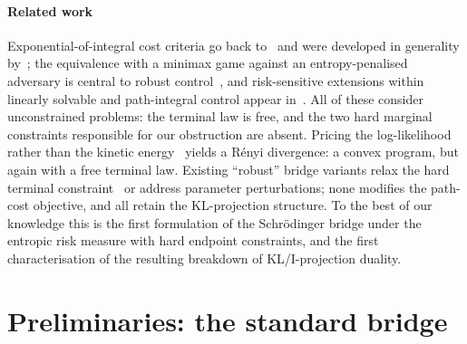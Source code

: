 \documentclass[letterpaper,10pt,conference]{IEEEtran}
\begin{document}
	\paragraph*{Related work}
	Exponential-of-integral cost criteria go back to~\cite{jacobson1973} and were
	developed in generality by~\cite{whittle1990,flemingmceneaney1995};
	the equivalence with a minimax game against an entropy-penalised adversary is
	central to robust control~\cite{basar1995}, and
	risk-sensitive extensions within linearly solvable and path-integral control
	appear in~\cite{vandenbroek2010}. All of these consider
	unconstrained problems: the terminal law is free, and the two hard
	marginal constraints responsible for our obstruction are absent. Pricing the
	log-likelihood rather than the kinetic energy~\cite{ito2024renyi} yields a
	R\'enyi divergence: a convex program, but again with a free terminal law. Existing ``robust'' bridge variants relax the hard terminal
	constraint~\cite{chen2019relaxed} or address parameter perturbations; none
	modifies the path-cost objective, and all retain the KL-projection structure. To the best of our
	knowledge this is the first formulation of the Schr\"odinger bridge under the
	entropic risk measure with hard endpoint constraints, and the first
	characterisation of the resulting breakdown of KL/I-projection duality.
	
	\section{Preliminaries: the standard bridge}
	\label{sec:prelim}
	
\end{document}
